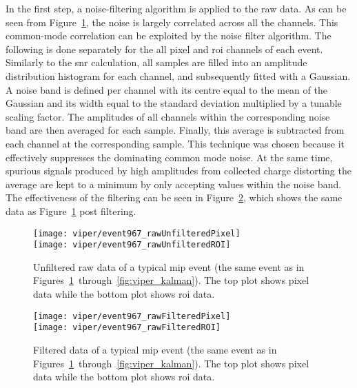 In the first step, a noise-filtering algorithm is applied to the raw data.
As can be seen from Figure~\ref{fig:viper_unfilteredRawData}, the noise is largely correlated across all the channels.
This common-mode correlation can be exploited by the noise filter algorithm.
The following is done separately for the all pixel and \gls{roi} channels of each event.
Similarly to the \gls{snr} calculation, all samples are filled into an amplitude distribution histogram for each channel, and subsequently fitted with a Gaussian.
A noise band is defined per channel with its centre equal to the mean of the Gaussian and its width equal to the standard deviation multiplied by a tunable scaling factor.
The amplitudes of all channels within the corresponding noise band are then averaged for each sample.
Finally, this average is subtracted from each channel at the corresponding sample.
This technique was chosen because it effectively suppresses the dominating common mode noise.
At the same time, spurious signals produced by high amplitudes from collected charge distorting the average are kept to a minimum by only accepting values within the noise band.
The effectiveness of the filtering can be seen in Figure~\ref{fig:viper_filteredRawData}, which shows the same data as Figure~\ref{fig:viper_unfilteredRawData} post filtering.

\begin{figure}[htb]
	\centering
	\texttt{[image: viper/event967\_rawUnfilteredPixel]}\\
	\texttt{[image: viper/event967\_rawUnfilteredROI]}
	\caption[Unfiltered raw data of typical pixel demonstrator event]{%
		Unfiltered raw data of a typical \acrshort{mip} event (the same event as in Figures~\ref{fig:viper_unfilteredRawData}~through~\ref{fig:viper_kalman}).
		The top plot shows pixel data while the bottom plot shows \acrshort{roi} data.
	}
	\label{fig:viper_unfilteredRawData}
\end{figure}

\begin{figure}[htb]
	\centering
	\texttt{[image: viper/event967\_rawFilteredPixel]}\\
	\texttt{[image: viper/event967\_rawFilteredROI]}
	\caption[Filtered data of typical pixel demonstrator event]{%
		Filtered data of a typical \acrshort{mip} event (the same event as in Figures~\ref{fig:viper_unfilteredRawData}~through~\ref{fig:viper_kalman}).
		The top plot shows pixel data while the bottom plot shows \acrshort{roi} data.
	}
	\label{fig:viper_filteredRawData}
\end{figure}

